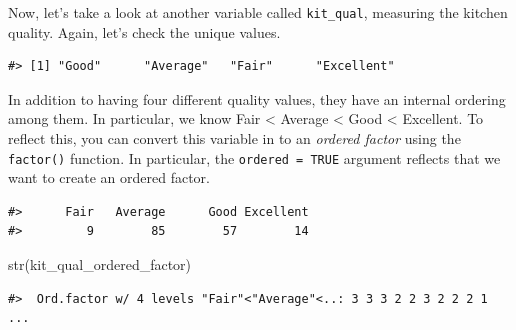 \documentclass[
]{book}
\newenvironment{Shaded}{\begin{snugshade}}{\end{snugshade}}
\newcommand{\AttributeTok}[1]{\textcolor[rgb]{0.77,0.63,0.00}{#1}}
\newcommand{\CommentTok}[1]{\textcolor[rgb]{0.56,0.35,0.01}{\textit{#1}}}
\newcommand{\ConstantTok}[1]{\textcolor[rgb]{0.00,0.00,0.00}{#1}}
\newcommand{\FunctionTok}[1]{\textcolor[rgb]{0.00,0.00,0.00}{#1}}
\newcommand{\NormalTok}[1]{#1}
\newcommand{\OtherTok}[1]{\textcolor[rgb]{0.56,0.35,0.01}{#1}}
\newcommand{\SpecialCharTok}[1]{\textcolor[rgb]{0.00,0.00,0.00}{#1}}
\newcommand{\StringTok}[1]{\textcolor[rgb]{0.31,0.60,0.02}{#1}}
\begin{document}
Now, let's take a look at another variable called \texttt{kit\_qual}, measuring the kitchen quality. Again, let's check the unique values.

\begin{Shaded}
\end{Shaded}

\begin{verbatim}
#> [1] "Good"      "Average"   "Fair"      "Excellent"
\end{verbatim}

In addition to having four different quality values, they have an internal ordering among them. In particular, we know Fair \textless{} Average \textless{} Good \textless{} Excellent. To reflect this, you can convert this variable in to an \emph{ordered factor} using the \texttt{factor()} function. In particular, the \texttt{ordered\ =\ TRUE} argument reflects that we want to create an ordered factor.

\begin{Shaded}
\end{Shaded}

\begin{verbatim}
#>      Fair   Average      Good Excellent 
#>         9        85        57        14
\end{verbatim}

\begin{Shaded}
\begin{Highlighting}[]
\FunctionTok{str}\NormalTok{(kit\_qual\_ordered\_factor)}
\end{Highlighting}
\end{Shaded}

\begin{verbatim}
#>  Ord.factor w/ 4 levels "Fair"<"Average"<..: 3 3 3 2 2 3 2 2 2 1 ...
\end{verbatim}
\end{document}
